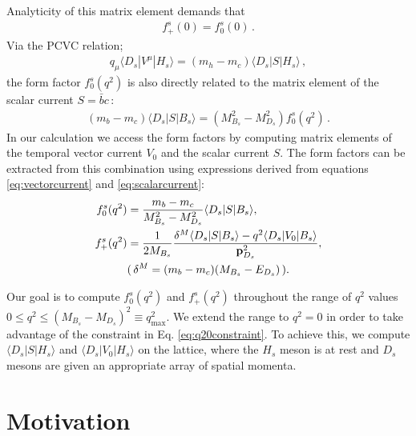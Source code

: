 Analyticity of this matrix element demands that
\begin{align}
  f_+^s(0) = f_0^s(0)\,.
  \label{eq:q20constraint}
\end{align}
Via the PCVC relation;
\begin{align}
  q_{\mu} \langle D_s | V^{\mu} | H_s \rangle = (m_{h} - m_{c}) \langle D_s | S | H_s \rangle\,,
\end{align}
the form factor $f_0^s(q^2)$ is also directly related to the matrix element of the scalar current $S=\bar{b}c\,$:
\begin{align}
  (m_b-m_c)\langle D_s | S | B_s \rangle = (M^2_{B_s} - M^2_{D_s}) f_0^s(q^2)\,.
    \label{eq:scalarcurrent}
\end{align}
In our calculation we access the form factors by computing matrix elements of the temporal vector current $V_0$ and the scalar current $S$. The form factors can be extracted from this combination using expressions derived from equations \eqref{eq:vectorcurrent} and \eqref{eq:scalarcurrent}:
\begin{align}
  f_0^s(q^2) &= {m_b - m_c\over M_{B_s}^2 - M_{D_s}^2 } \langle D_s | S | B_s \rangle, \\
  f_+^s(q^2) &= {1\over 2M_{B_s}} { \delta^M \langle D_s | S | B_s \rangle - q^2 \langle D_s | V_0 | B_s \rangle \over {\bf{p}}^2_{D_s}}, \\
    &( \, \delta^M = (m_b - m_c)(M_{B_s}-E_{D_s}) \, ). \nonumber
\end{align}

Our goal is to compute $f_0^s(q^2)$ and $f_+^s(q^2)$ throughout the range of $q^2$ values $0 \leq q^2 \leq (M_{B_s}-M_{D_s})^2 \equiv q^2_{\text{max}}$. We extend the range to $q^2=0$ in order to take advantage of the constraint in Eq. \eqref{eq:q20constraint}. To achieve this, we compute $\langle D_s | S | H_s \rangle$ and $\langle D_s | V_0 | H_s \rangle$ on the lattice, where the $H_s$ meson is at rest and $D_s$ mesons are given an appropriate array of spatial momenta.


\section{Motivation}
\label{sec:BsDs_intro}


